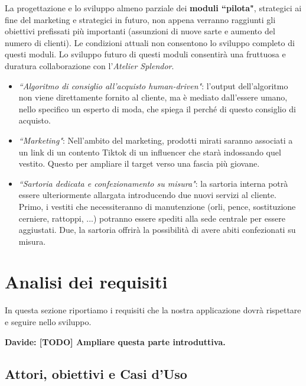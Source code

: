 \documentclass[12pt]{article}
\newcommand{\davide}[1]{{\bf \color{chromeyellow} Davide: #1 }}
\begin{document}
La progettazione e lo sviluppo almeno parziale dei \textbf{moduli ``pilota"}, strategici ai fine del marketing e strategici in futuro, non appena verranno raggiunti gli obiettivi prefissati più importanti (assunzioni di nuove sarte e aumento del numero di clienti). Le condizioni attuali non consentono lo sviluppo completo di questi moduli. Lo sviluppo futuro di questi moduli consentirà una fruttuosa e duratura collaborazione con l'{\em Atelier Splendor}.
\begin{itemize}
    \item {\em ``Algoritmo di consiglio all'acquisto human-driven"}: l'output dell'algoritmo non viene direttamente fornito al cliente, ma è mediato dall'essere umano, nello specifico un esperto di moda, che spiega il perché di questo consiglio di acquisto.
    \item {\em ``Marketing"}: Nell'ambito del marketing, prodotti mirati saranno associati a un link di un contento Tiktok di un influencer che starà indossando quel vestito. Questo per ampliare il target verso una fascia più giovane.
    \item {\em ``Sartoria dedicata e confezionamento su misura"}: la sartoria interna potrà essere ulteriormente allargata introducendo due nuovi servizi al cliente. Primo, i vestiti che necessiteranno di manutenzione (orli, pence, sostituzione cerniere, rattoppi, ...) potranno essere spediti alla sede centrale per essere aggiustati. Due, la sartoria offrirà la possibilità di avere abiti confezionati su misura.
\end{itemize}


\section{Analisi dei requisiti}

In questa sezione riportiamo i requisiti che la nostra applicazione dovrà rispettare e seguire nello sviluppo.

\davide{\textbf{[TODO]} Ampliare questa parte introduttiva.}

\subsection{Attori, obiettivi e Casi d'Uso}
\label{subsec:UC}
\end{document}
